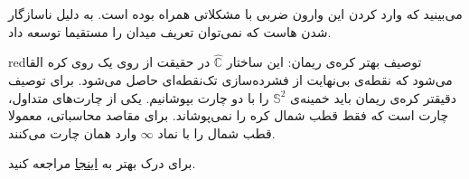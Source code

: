 \documentclass[a4paper, 12pt]{article}
\begin{document}
می‌بینید که وارد کردن این وارون ضربی با مشکلاتی همراه بوده است. به دلیل ناسازگار شدن 
هاست که نمی‌توان تعریف میدان را مستقیما توسعه داد.

\begin{boxes}{red}{توصیف بهتر کره‌ی ریمان:}
	این ساختار 
	$\hat{\mathbb{C}}$
	در حقیقت از روی یک 
	روی کره‌ القا می‌شود که نقطه‌ی بی‌نهایت از فشرده‌سازی تک‌نقطه‌ای حاصل می‌شود. برای توصیف دقیقتر کره‌ی ریمان باید خمینه‌ی 
	$\mathbb{S}^2$
	را با دو چارت بپوشانیم. یکی از چارت‌های متداول، چارت
	است که فقط قطب شمال کره‌ را نمی‌پوشاند. برای مقاصد محاسباتی، معمولا قطب شمال را با نماد 
	$\infty$
	وارد همان چارت می‌کنند.
	
	برای درک بهتر به 
	\href{https://en.wikipedia.org/wiki/Riemann_sphere#As_a_sphere}{اینجا}
	مراجعه کنید.
\end{boxes}
\end{document}
